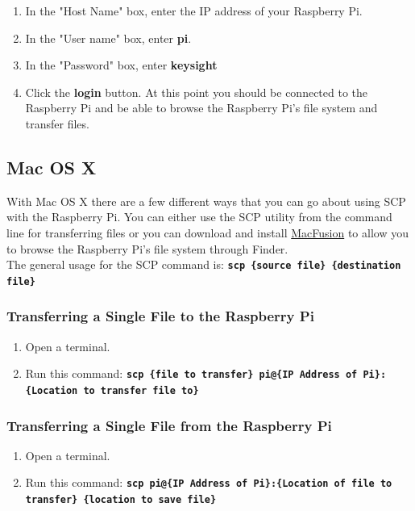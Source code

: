 \documentclass{article}
\def\code#1{\textbf{\texttt{#1}}}
\begin{document}
\begin{enumerate}[1.)]
			\item In the "Host Name" box, enter the IP address of your Raspberry Pi.
			
			\item In the "User name" box, enter \textbf{pi}.
			
			\item In the "Password" box, enter \textbf{keysight}
			
			\item Click the \textbf{login} button. At this point you should be connected to the Raspberry Pi and be able to browse the Raspberry Pi's file system and transfer files.
			
		\end{enumerate}
	

	
	
	\subsection{Mac OS X}
	
	With Mac OS X there are a few different ways that you can go about using SCP with the Raspberry Pi. You can either use the SCP utility from the command line for transferring files or you can download and install \href{http://macfusionapp.org/}{MacFusion} to allow you to browse the Raspberry Pi's file system through Finder. \\
	
	The general usage for the SCP command is: \code{scp \{source file\} \{destination file\}}
	
		\subsubsection{Transferring a Single File to the Raspberry Pi}
		
		\begin{enumerate}[1.)]
			\item Open a terminal.
			
			\item Run this command: \code{scp \{file to transfer\} pi@\{IP Address of Pi\}:\{Location to transfer file to\}}
		\end{enumerate}
	
		\subsubsection{Transferring a Single File from the Raspberry Pi}
	
		\begin{enumerate}[1.)]
			\item Open a terminal.
			
			\item Run this command: \code{scp pi@\{IP Address of Pi\}:\{Location of file to transfer\} \{location to save file\}} 
		\end{enumerate}
	
\end{document}

